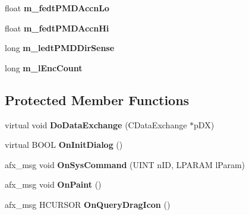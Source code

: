 \begin{DoxyCompactItemize}
\item 
float {\bfseries m\+\_\+fedt\+P\+M\+D\+Accn\+Lo}\hypertarget{class_c_a_p_t_d_l_l_client_dlg_a2c8b037f80e95094837f3a078d162842}{}\label{class_c_a_p_t_d_l_l_client_dlg_a2c8b037f80e95094837f3a078d162842}

\item 
float {\bfseries m\+\_\+fedt\+P\+M\+D\+Accn\+Hi}\hypertarget{class_c_a_p_t_d_l_l_client_dlg_a0f01f196eb07261e9f0782f74b545d79}{}\label{class_c_a_p_t_d_l_l_client_dlg_a0f01f196eb07261e9f0782f74b545d79}

\item 
long {\bfseries m\+\_\+ledt\+P\+M\+D\+Dir\+Sense}\hypertarget{class_c_a_p_t_d_l_l_client_dlg_a7bc9481b9e5548ffde836dc9ba868959}{}\label{class_c_a_p_t_d_l_l_client_dlg_a7bc9481b9e5548ffde836dc9ba868959}

\item 
long {\bfseries m\+\_\+l\+Enc\+Count}\hypertarget{class_c_a_p_t_d_l_l_client_dlg_ad0985ca4a1c62aeea7b05d0a433ad2b4}{}\label{class_c_a_p_t_d_l_l_client_dlg_ad0985ca4a1c62aeea7b05d0a433ad2b4}

\end{DoxyCompactItemize}
\subsection*{Protected Member Functions}
\begin{DoxyCompactItemize}
\item 
virtual void {\bfseries Do\+Data\+Exchange} (C\+Data\+Exchange $\ast$p\+DX)\hypertarget{class_c_a_p_t_d_l_l_client_dlg_a6131959d4b39751278148d67f91766e9}{}\label{class_c_a_p_t_d_l_l_client_dlg_a6131959d4b39751278148d67f91766e9}

\item 
virtual B\+O\+OL {\bfseries On\+Init\+Dialog} ()\hypertarget{class_c_a_p_t_d_l_l_client_dlg_a6021500da3137f7a778b33fcadbfd23a}{}\label{class_c_a_p_t_d_l_l_client_dlg_a6021500da3137f7a778b33fcadbfd23a}

\item 
afx\+\_\+msg void {\bfseries On\+Sys\+Command} (U\+I\+NT n\+ID, L\+P\+A\+R\+AM l\+Param)\hypertarget{class_c_a_p_t_d_l_l_client_dlg_a02af48667bfa0582d3e1c388bda9f9c7}{}\label{class_c_a_p_t_d_l_l_client_dlg_a02af48667bfa0582d3e1c388bda9f9c7}

\item 
afx\+\_\+msg void {\bfseries On\+Paint} ()\hypertarget{class_c_a_p_t_d_l_l_client_dlg_aeb497f399efde411b271095b1c305257}{}\label{class_c_a_p_t_d_l_l_client_dlg_aeb497f399efde411b271095b1c305257}

\item 
afx\+\_\+msg H\+C\+U\+R\+S\+OR {\bfseries On\+Query\+Drag\+Icon} ()\hypertarget{class_c_a_p_t_d_l_l_client_dlg_a3ac33787f55561c8b29ec527757853e6}{}\label{class_c_a_p_t_d_l_l_client_dlg_a3ac33787f55561c8b29ec527757853e6}

\end{DoxyCompactItemize}
